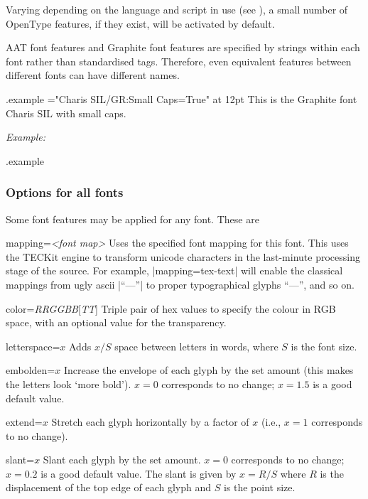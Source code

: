 \documentclass[12pt]{article}
\newenvironment{optdesc}
  {\begin{description}[font=\ttfamily,style=nextline,leftmargin=1.5cm]}
  {\end{description}}
\edef\examplefilename{\jobname.example}
\newlength\exampleindent
\newenvironment{example}
  {\VerbatimEnvironment
   \begin{VerbatimOut}{\examplefilename}}
  {\end{VerbatimOut}
   \typesetexample}
\newcommand\typesetexample{%
  \begin{trivlist}\item[]
  \vrule
  \hspace{\exampleindent}
  \begin{minipage}{\linewidth-\exampleindent-\exampleindent}
    \textit{Example:}\par
    \vspace{0.4\baselineskip}
    \BVerbatimInput[fontsize=\small]{\examplefilename}\par
    \vspace{0.4\baselineskip}
    \color[rgb]{0.7,0,0}\examplefilename\relax
  \end{minipage}\par
  \end{trivlist}}
\begin{document}
Varying depending on the language and script in use (see
), a small number of OpenType features, if they
exist, will be activated by default.

AAT font features and Graphite font features are specified by strings
within each font rather than standardised tags. Therefore, even
equivalent features between different fonts can have different names.

\begin{example}
\font\gra="Charis SIL/GR:Small Caps=True" at 12pt
\gra This is the Graphite font Charis SIL with small caps.
\end{example}

\subsubsection{Options for all fonts}

Some font features may be applied for any font. These are
\begin{optdesc}
\item[mapping=\textsl{<font map>}] 
Uses the specified font mapping for this font. This uses the TECKit
engine to transform unicode characters in the last-minute processing
stage of the source. For example, |mapping=tex-text| will enable the
classical mappings from ugly ascii |``---''| to proper typographical
glyphs ``---'', and so on.

\item[color={\slshape RRGGBB}{[{\slshape TT}]}] 
Triple pair of hex values to specify the colour in RGB space, with an
optional value for the transparency.

\item[letterspace=$x$] 
Adds $x/S$ space between letters in words, where $S$ is the font size.

\item[embolden=$x$]
Increase the envelope of each glyph by the set amount (this makes the
letters look `more bold'). $x=0$ corresponds to no change; $x=1.5$ is a
good default value.

\item[extend=$x$]
Stretch each glyph horizontally by a factor of $x$ (i.e., $x=1$
corresponds to no change).

\item[slant=$x$]
Slant each glyph by the set amount. $x=0$ corresponds to no change;
$x=0.2$ is a good default value. The slant is given by $x=R/S$ where $R$
is the displacement of the top edge of each glyph and $S$ is the point
size.

\end{optdesc}
\end{document}
